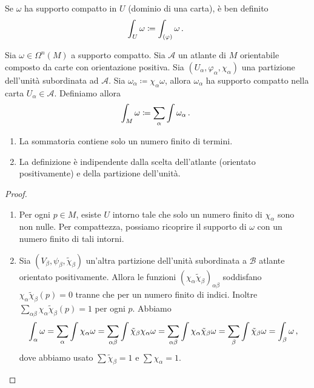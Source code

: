 \begin{corollary}
	Se $\omega$ ha supporto compatto in $U$ (dominio di una carta), è ben definito
	\begin{equation*}
		\int_U \omega \coloneqq \int_{(\varphi)} \omega \, \text{. }
	\end{equation*}
\end{corollary}


\begin{definition}
	Sia $\omega \in \Omega^n(M)$ a supporto compatto. Sia $\mathcal A$ un atlante di $M$ orientabile composto da carte con orientazione positiva. Sia $(U_\alpha, \varphi_\alpha, \chi_\alpha)$ una partizione dell'unità subordinata ad $\mathcal A$. Sia $\omega_\alpha \coloneqq \chi_\alpha\omega$, allora $\omega_\alpha$ ha supporto compatto nella carta $U_\alpha\in\mathcal A$.
	Definiamo allora
	\begin{equation*}
		\int_M \omega \coloneqq \sum_\alpha \int \omega_\alpha \, \text{. }
	\end{equation*}
\end{definition}

\begin{proposition}
	\begin{enumerate}
		\item La sommatoria contiene solo un numero finito di termini.
		\item La definizione è indipendente dalla scelta dell'atlante (orientato positivamente) e della partizione dell'unità.
	\end{enumerate}
\end{proposition}
\begin{proof}
	\begin{enumerate}
		\item Per ogni $p\in M$, esiste $U$ intorno tale che solo un numero finito di $\chi_\alpha$ sono non nulle. Per compattezza, possiamo ricoprire il supporto di $\omega$ con un numero finito di tali intorni.
		
		\item Sia $(V_\beta, \psi_\beta, \tilde \chi_\beta)$ un'altra partizione dell'unità subordinata a $\mathcal B$ atlante orientato positivamente. Allora le funzioni $(\chi_\alpha \tilde\chi_\beta)_{\alpha\beta}$ soddisfano $\chi_\alpha \tilde\chi_\beta(p) = 0$ tranne che per un numero finito di indici. Inoltre $\sum_{\alpha\beta} \chi_\alpha \tilde\chi_\beta(p) = 1$ per  ogni $p$.
		Abbiamo
		\begin{equation*}
			\int_\alpha \omega = \sum_\alpha \int \chi_\alpha \omega = \sum_{\alpha \beta} \int \tilde \chi_\beta \chi_\alpha \omega = \sum_{\alpha \beta} \int  \chi_\alpha \tilde \chi_\beta \omega = \sum_\beta \int \tilde\chi_\beta \omega = \int_\beta \omega \, \text{, }
		\end{equation*}
		dove abbiamo usato $\sum \tilde \chi_\beta = 1$ e $\sum \chi_\alpha = 1$.
	\end{enumerate}
\end{proof}

